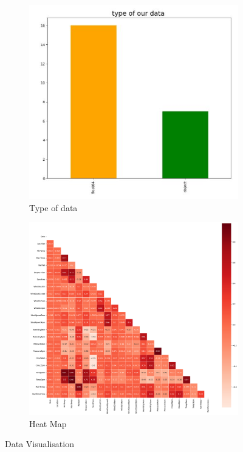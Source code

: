 \documentclass{josis}
\begin{document}
\begin{figure}[!h]
    \centering
    
    \begin{subfigure}[b]{0.4\textwidth}
        \centering
        \includegraphics[width=\textwidth]{bargraph of data type.JPG}
        \caption{Type of data}
        \label{fig:subfig1}
    \end{subfigure}
    \hfill
    \begin{subfigure}[b]{0.4\textwidth}
        \centering
        \includegraphics[width=\textwidth]{correlation.JPG}
        \caption{Heat Map}
        \label{fig:subfig2}
    \end{subfigure}
    
    \caption{Data Visualisation}
    \label{fig:mainfig}
\end{figure}
\end{document}
